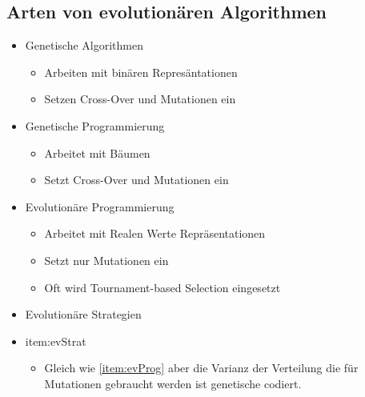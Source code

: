   \subsection{Arten von evolutionären Algorithmen}
  \label{sub:artenEvAlgos}
    \begin{itemize}
      \item Genetische Algorithmen
      \label{item:genAlgo}
        \begin{itemize}
          \item Arbeiten mit binären Represäntationen
          \item Setzen Cross-Over und Mutationen ein
        \end{itemize}
      \item Genetische Programmierung
      \label{item:genProg}
        \begin{itemize}
          \item Arbeitet mit Bäumen
          \item Setzt Cross-Over und Mutationen ein
        \end{itemize}
      \item Evolutionäre Programmierung
      \label{item:evProg}
        \begin{itemize}
          \item Arbeitet mit Realen Werte Repräsentationen
          \item Setzt nur Mutationen ein
          \item Oft wird Tournament-based Selection eingesetzt
        \end{itemize}
      \item Evolutionäre Strategien
      \item{item:evStrat}
        \begin{itemize}
          \item Gleich wie \ref{item:evProg} aber die Varianz der Verteilung die für Mutationen gebraucht werden ist genetische codiert.
        \end{itemize}
    \end{itemize}
